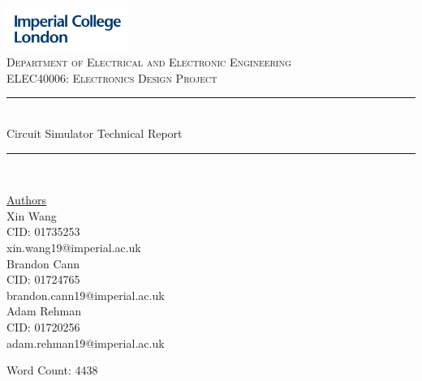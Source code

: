 \documentclass[12pt,a4paper]{article}
\begin{document}
\begin{titlepage}
	\newcommand{\HRule}{\rule{\linewidth}{0.5mm}}
    \includegraphics[width = 4cm]{./Images/Logo.jpg}\\[0.5cm] 
    
    \center 
	\textsc{\large Department of Electrical and Electronic Engineering }\\[0.5cm] 
	\textsc{\normalsize ELEC40006: Electronics Design Project}\\[0.5cm] 
    
	\HRule \\[0.4cm]
	Circuit Simulator Technical Report
    \HRule \\[1.5cm]
     
    \begin{center}
		\underline{Authors}\\[0.5cm] Xin Wang\\CID: 01735253\\xin.wang19@imperial.ac.uk \\[0.5cm]
		Brandon Cann\\ CID: 01724765\\ brandon.cann19@imperial.ac.uk\\[0.5cm]
		Adam Rehman\\ CID: 01720256\\adam.rehman19@imperial.ac.uk\\[0.5cm]
	\end{center} \large
    
    \vfill %
 	\small Word Count: 4438 \\ [0.5cm]
    \makeatletter
    \@date 
    \makeatother
\end{titlepage}

\tableofcontents
\pagebreak
\end{document}
